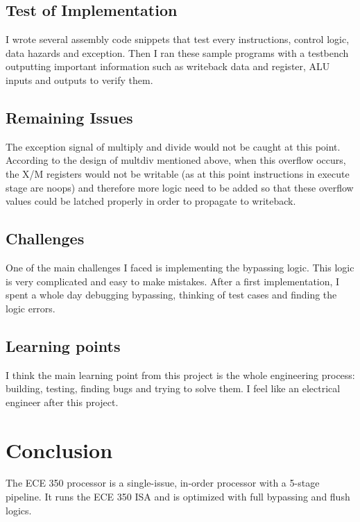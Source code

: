 \documentclass{article}
\begin{document}
\subsection{Test of Implementation}
I wrote several assembly code snippets that test every instructions, control logic, data hazards and exception. Then I ran these sample programs with a testbench outputting important information such as writeback data and register, ALU inputs and outputs to verify them.

\subsection{Remaining Issues}
The exception signal of multiply and divide would not be caught at this point. According to the design of multdiv mentioned above, when this overflow occurs, the X/M registers would not be writable (as at this point instructions in execute stage are noops) and therefore more logic need to be added so that these overflow values could be latched properly in order to propagate to writeback.

\subsection{Challenges}
One of the main challenges I faced is implementing the bypassing logic. This logic is very complicated and easy to make mistakes. After a first implementation, I spent a whole day debugging bypassing, thinking of test cases and finding the logic errors.

\subsection{Learning points}
I think the main learning point from this project is the whole engineering process: building, testing, finding bugs and trying to solve them. I feel like an electrical engineer after this project.

\section{Conclusion}
The ECE 350 processor is a single-issue, in-order processor with a 5-stage pipeline. It runs the ECE 350 ISA and is optimized with full bypassing and flush logics.

\newpage
\appendix
\end{document}
